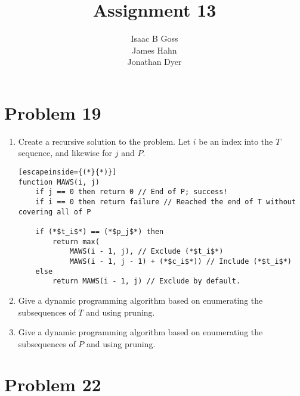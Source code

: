 \documentclass{article}
\author{Isaac B Goss\\ James Hahn\\ Jonathan Dyer}
\title{Assignment 13}
\providecommand{\prob}[1]{\section*{Problem #1}}
\begin{document}
\maketitle

    \prob{19}
    \begin{enumerate}[label=(\alph*)]
        \item Create a recursive solution to the problem.
            Let $i$ be an index into the $T$ sequence, and likewise for $j$ and $P$.
            \begin{lstlisting}[escapeinside={(*}{*)}]
function MAWS(i, j)
    if j == 0 then return 0 // End of P; success!
    if i == 0 then return failure // Reached the end of T without covering all of P

    if (*$t_i$*) == (*$p_j$*) then
        return max(
            MAWS(i - 1, j), // Exclude (*$t_i$*)
            MAWS(i - 1, j - 1) + (*$c_i$*)) // Include (*$t_i$*)
    else
        return MAWS(i - 1, j) // Exclude by default.
            \end{lstlisting}
        \item Give a dynamic programming algorithm based on enumerating the subsequences of $T$ and using pruning.

        \item Give a dynamic programming algorithm based on enumerating the subsequences of $P$ and using pruning.
    \end{enumerate}

    \prob{22}
\end{document}
